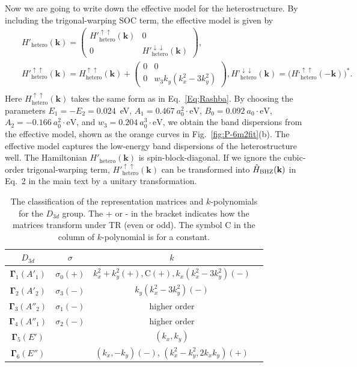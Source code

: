 \documentclass[aps, preprint, prb,]{revtex4-2}
\def\kk{\mathbf{k}}
\begin{document}
Now we are going to write down the effective model for the heterostructure. By including the trigonal-warping SOC term, the effective model is given by
\begin{eqnarray}
&&H'_{\mathrm{hetero}}(\kk)=
\begin{pmatrix}
H'^{\uparrow\uparrow}_{\mathrm{hetero}}(\kk) & 0 \\
0 & H'^{\downarrow\downarrow}_{\mathrm{hetero}}(\kk)
\end{pmatrix},\nonumber\\
&&H'^{\uparrow\uparrow}_{\mathrm{hetero}}(\kk)=H^{\uparrow\uparrow}_{\mathrm{hetero}}(\kk)+
\begin{pmatrix}
0 & 0 \nonumber \\
0 &w_3 k_y(k_x^2-3k_y^2)
\end{pmatrix}, H’^{\downarrow\downarrow}_{\mathrm{hetero}}(\kk)=
\bigl(H‘^{\uparrow\uparrow}_{\mathrm{hetero}}(-\kk)\bigr)^*. \\
 \label{Eq;trigonal-warping}
\end{eqnarray}
Here $H^{\uparrow\uparrow}_{\mathrm{hetero}}(\kk)$ takes the same form as in Eq.~\ref{Eq;Rashba}. By choosing the parameters $E_1=-E_2=0.024$~eV, $A_1=0.467~a_0^2\!\cdot\!\mathrm{eV}$, $B_0=0.092~a_0\!\cdot\!\mathrm{eV}$, $A_2=-0.166~a_0^2\!\cdot\!\mathrm{eV}$, and $w_3=0.204~a_0^3\!\cdot\!\mathrm{eV}$, we obtain the band dispersions from the effective model, shown as the orange curves in Fig.~\ref{fig:P-6m2fit}(b). The effective model captures the low-energy band dispersions of the heterostructure well. The Hamiltonian $H'_{\mathrm{hetero}}(\kk)$ is spin-block-diagonal. If we ignore the cubic-order trigonal-warping term, $H'^{\uparrow\uparrow}_{\mathrm{hetero}}(\kk)$ can be transformed into $\hat{H}_{\rm BHZ}(\mathbf{k})$ in Eq.~2 in the main text by a unitary transformation.

\begin{table}[htbp]
\centering
\renewcommand{\arraystretch}{1.5}
\begin{tabular}{|c|c|c|c|}
\hline
\(D_{3d}\) & \(\sigma\) & \(k\) \\ 
\hline
\(\mathbf{\Gamma}_1 (A'_1)\)  & \(\sigma_0(+)\) & \(k_x^2 + k_y^2(+), \text{C}(+),k_x(k_x^2-3k_y^2)(-)\) \\
\hline 
\(\mathbf{\Gamma}_2 (A'_2)\)&  \(\sigma_3(-)\) & \( k_y(k_x^2-3k_y^2)(-)\)\\
\hline
\(\mathbf{\Gamma}_3 (A''_2)\)  & \(\sigma_1(-)\) &higher order  \\ 
\hline
\(\mathbf{\Gamma}_4 (A''_1)\)  &  \(\sigma_2(-)\) & higher order  \\
\hline 
\(\mathbf{\Gamma}_5 (E')\)&  & $(k_x,k_y)$ \\
\hline
\(\mathbf{\Gamma}_6 (E'')\)  &  & \((k_x,-k_y)(-)\), $(k^2_x-k^2_y, 2k_x k_y)(+)$ \\ 
\hline
\end{tabular}
\caption{\justifying  The classification of the representation matrices and $k$-polynomials for the $D_{3d}$ group. The + or - in the bracket indicates how the matrices transform under TR (even or odd). The symbol $\text{C}$ in the column of $k$-polynomial is for a constant. \label{TAB: symmetry D3d matrix} }
\end{table}
\end{document}
